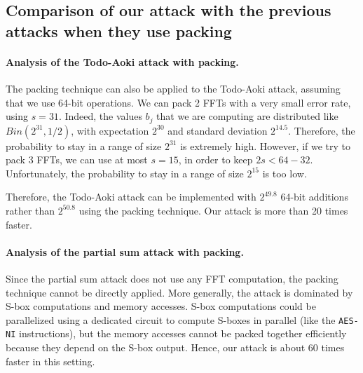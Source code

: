 \subsection{Comparison of our attack with the previous attacks when they use packing}

\paragraph{Analysis of the Todo-Aoki attack with packing.}

The packing technique can also be applied to the Todo-Aoki attack,
assuming that we use 64-bit operations.  We can pack 2 FFTs with a very
small error rate, using $s=31$.  Indeed, the values $b_j$ that we are
computing are distributed like $Bin(2^{31},1/2)$, with expectation
$2^{30}$ and standard deviation $2^{14.5}$.  Therefore, the
probability to stay in a range of size $2^{31}$ is extremely high.
However, if we try to pack 3 FFTs, we can use at most $s=15$, in order to
keep $2s < 64-32$.  Unfortunately, the probability to stay in a range of
size $2^{15}$ is too low.

Therefore, the Todo-Aoki attack can be implemented with $2^{49.8}$
64-bit additions rather than $2^{50.8}$ using the packing technique.
Our attack is more than 20 times faster.

\paragraph{Analysis of the partial sum attack with packing.}

Since the partial sum attack does not use any FFT computation, the
packing technique cannot be directly applied.  More generally, the attack is
dominated by S-box computations and memory accesses.  S-box computations could be
parallelized using a dedicated circuit to compute S-boxes in parallel (like the
\texttt{AES-NI} instructions), but the memory accesses cannot be packed together
efficiently because they depend on the S-box output. Hence, our attack is about 60 times faster in this setting.    
